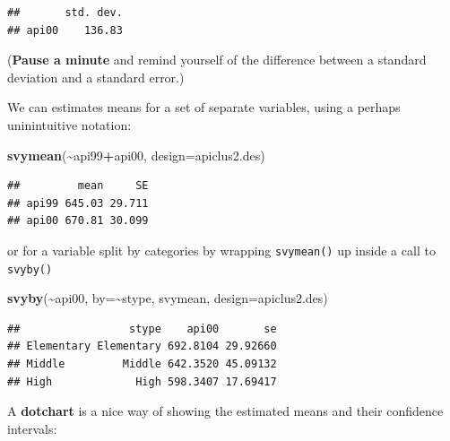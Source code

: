 \documentclass[
]{book}
\newenvironment{Shaded}{\begin{snugshade}}{\end{snugshade}}
\newcommand{\AttributeTok}[1]{\textcolor[rgb]{0.13,0.29,0.53}{#1}}
\newcommand{\FunctionTok}[1]{\textcolor[rgb]{0.13,0.29,0.53}{\textbf{#1}}}
\newcommand{\NormalTok}[1]{#1}
\newcommand{\SpecialCharTok}[1]{\textcolor[rgb]{0.81,0.36,0.00}{\textbf{#1}}}
\begin{document}
\begin{verbatim}
##       std. dev.
## api00    136.83
\end{verbatim}

(\textbf{Pause a minute} and remind yourself of the difference between a standard deviation and
a standard error.)

We can estimates means for a set of separate variables, using a perhaps uninintuitive notation:

\begin{Shaded}
\begin{Highlighting}[]
\FunctionTok{svymean}\NormalTok{(}\SpecialCharTok{\textasciitilde{}}\NormalTok{api99}\SpecialCharTok{+}\NormalTok{api00, }\AttributeTok{design=}\NormalTok{apiclus2.des)}
\end{Highlighting}
\end{Shaded}

\begin{verbatim}
##         mean     SE
## api99 645.03 29.711
## api00 670.81 30.099
\end{verbatim}

or for a variable split by categories by wrapping \texttt{svymean()} up inside a call to \texttt{svyby()}

\begin{Shaded}
\begin{Highlighting}[]
\FunctionTok{svyby}\NormalTok{(}\SpecialCharTok{\textasciitilde{}}\NormalTok{api00, }\AttributeTok{by=}\SpecialCharTok{\textasciitilde{}}\NormalTok{stype, svymean, }\AttributeTok{design=}\NormalTok{apiclus2.des)}
\end{Highlighting}
\end{Shaded}

\begin{verbatim}
##                 stype    api00       se
## Elementary Elementary 692.8104 29.92660
## Middle         Middle 642.3520 45.09132
## High             High 598.3407 17.69417
\end{verbatim}

A \textbf{dotchart} is a nice way of showing the estimated means and their confidence intervals:
\end{document}
